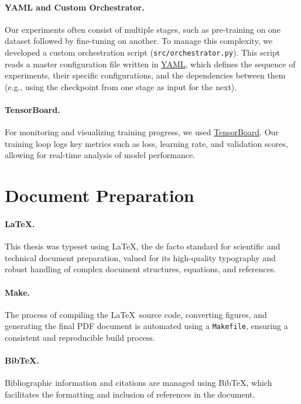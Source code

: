 \paragraph{YAML and Custom Orchestrator.} Our experiments often consist of multiple stages, such as pre-training on one dataset followed by fine-tuning on another. To manage this complexity, we developed a custom orchestration script (\texttt{src/orchestrator.py}). This script reads a master configuration file written in \href{https://yaml.org/}{YAML}, which defines the sequence of experiments, their specific configurations, and the dependencies between them (e.g., using the checkpoint from one stage as input for the next).

\paragraph{TensorBoard.} For monitoring and visualizing training progress, we used \href{https://www.tensorflow.org/tensorboard}{TensorBoard}. Our training loop logs key metrics such as loss, learning rate, and validation scores, allowing for real-time analysis of model performance.

\section{Document Preparation}

\paragraph{LaTeX.} This thesis was typeset using \LaTeX, the de facto standard for scientific and technical document preparation, valued for its high-quality typography and robust handling of complex document structures, equations, and references.

\paragraph{Make.} The process of compiling the \LaTeX\ source code, converting figures, and generating the final PDF document is automated using a \texttt{Makefile}, ensuring a consistent and reproducible build process.

\paragraph{BibTeX.} Bibliographic information and citations are managed using BibTeX, which facilitates the formatting and inclusion of references in the document.
